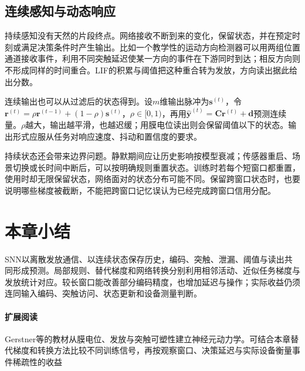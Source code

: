 \subsection{连续感知与动态响应}
\label{sec:snn-continuous-response}

持续感知没有天然的片段终点。网络接收不断到来的变化，保留状态，并在预定时刻或满足决策条件时产生输出。比如一个教学性的运动方向检测器可以用两组位置通道接收事件，利用不同突触延迟使某一方向的事件在下游同时到达；相反方向则不形成同样的时间重合。LIF的积累与阈值把这种重合转为发放，方向读出据此给出分数。

连续输出也可以从过滤后的状态得到。设$m$维输出脉冲为$\bm s^{(t)}$，令$\bm r^{(t)}=\rho\bm r^{(t-1)}+(1-\rho)\bm s^{(t)}$，$\rho\in[0,1)$，再用$\hat{\bm y}^{(t)}=\bm C\bm r^{(t)}+\bm d$预测连续量。$\rho$越大，输出越平滑，也越迟缓；用膜电位读出则会保留阈值以下的状态。输出形式应服从任务对响应速度、抖动和置信度的要求。

持续状态还会带来边界问题。静默期间应让历史影响按模型衰减；传感器重启、场景切换或长时间中断后，可以按明确规则重置状态。训练时若每个短窗口都重置，使用时却无限保留状态，网络面对的状态分布可能不同。保留跨窗口状态时，也要说明哪些梯度被截断，不能把跨窗口记忆误认为已经完成跨窗口信用分配。

\section{本章小结}
\label{sec:snn-summary}

SNN以离散发放通信、以连续状态保存历史，编码、突触、泄漏、阈值与读出共同形成预测。局部规则、替代梯度和网络转换分别利用相邻活动、近似任务梯度与发放统计对应。较长窗口能改善部分编码精度，也增加延迟与操作；实际收益仍须连同输入编码、突触访问、状态更新和设备测量判断。

\paragraph{扩展阅读}
Gerstner等的教材从膜电位、发放与突触可塑性建立神经元动力学。可结合本章替代梯度和转换方法比较不同训练信号，再按观察窗口、决策延迟与实际设备衡量事件稀疏性的收益
